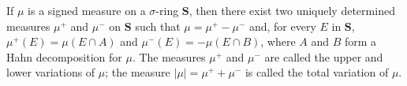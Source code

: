 If $\mu$ is a signed measure on a $\sigma$-ring $\mathbf{S}$, then there exist two uniquely determined measures $\mu^+$ and $\mu^-$ on $\mathbf{S}$ such that $\mu = \mu^+ - \mu^-$ and, for every $E$ in $\mathbf{S}$, $\mu^+(E) = \mu(E \cap A)$ and $\mu^-(E) = -\mu(E \cap B)$, where $A$ and $B$ form a Hahn decomposition for $\mu$. The measures $\mu^+$ and $\mu^-$ are called the upper and lower variations of $\mu$; the measure $|\mu| = \mu^+ + \mu^-$ is called the total variation of $\mu$.
